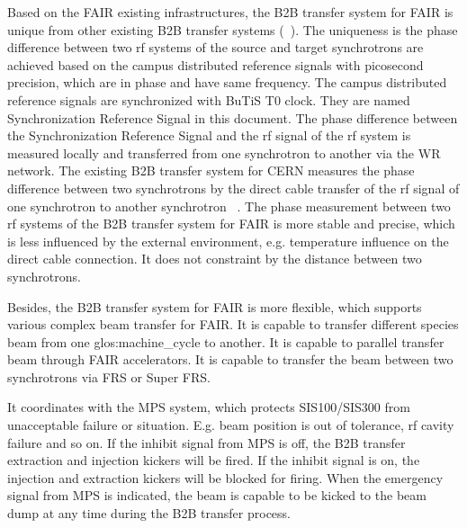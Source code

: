 Based on the FAIR existing infrastructures, the B2B transfer system for FAIR is unique from other existing B2B transfer systems (~\cite{ferrand_synchronization_2015, ezura_beam-dynamics_2008}). The uniqueness is the phase difference between two rf systems of the source and target synchrotrons are achieved based on the campus distributed reference signals with picosecond precision, which are in phase and have same frequency. The campus distributed reference signals are synchronized with BuTiS T0 clock. They are named Synchronization Reference Signal in this document. The phase difference between the Synchronization Reference Signal and the rf signal of the rf system is measured locally and transferred from one synchrotron to another via the WR network. The existing B2B transfer system for CERN measures the phase difference between two synchrotrons by the direct cable transfer of the rf signal of one synchrotron to another synchrotron ~\cite{ferrand_synchronization_2015}. The phase measurement between two rf systems of the B2B transfer system for FAIR is more stable and precise, which is less influenced by the external environment, e.g. temperature influence on the direct cable connection. It does not constraint by the distance between two synchrotrons.

Besides, the B2B transfer system for FAIR is more flexible, which supports various complex beam transfer for FAIR.  It is capable to transfer different species beam from one \gls{glos:machine_cycle} to another.  It is capable to parallel transfer beam through FAIR accelerators. It is capable to transfer the beam between two synchrotrons via FRS or Super FRS. 

It coordinates with the MPS system, which protects SIS100/SIS300 from unacceptable failure or situation. E.g. beam position is out of tolerance, rf cavity failure and so on. If the inhibit signal from MPS is off, the B2B transfer extraction and injection kickers will be fired. If the inhibit signal is on, the injection and extraction kickers will be blocked for firing.  When the emergency signal from MPS is indicated, the beam is capable to be kicked to the beam dump at any time during the B2B transfer process.


